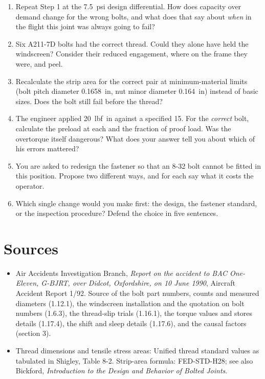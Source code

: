 \documentclass[11pt,a4paper]{article}
\begin{document}
\begin{enumerate}[leftmargin=*,itemsep=3pt]
\item Repeat Step 1 at the \SI{7.5}{psi} design differential. How does capacity over demand change
  for the wrong bolts, and what does that say about \emph{when} in the flight this joint was always
  going to fail?
\item Six A211-7D bolts had the correct thread. Could they alone have held the windscreen?
  Consider their reduced engagement, where on the frame they were, and peel.
\item Recalculate the strip area for the correct pair at minimum-material limits (bolt pitch
  diameter \SI{0.1658}{in}, nut minor diameter \SI{0.164}{in}) instead of basic sizes. Does the
  bolt still fail before the thread?
\item The engineer applied \SI{20}{lbf.in} against a specified 15. For the \emph{correct} bolt,
  calculate the preload at each and the fraction of proof load. Was the overtorque itself
  dangerous? What does your answer tell you about which of his errors mattered?
\item You are asked to redesign the fastener so that an 8-32 bolt cannot be fitted in this
  position. Propose two different ways, and for each say what it costs the operator.
\item Which single change would you make first: the design, the fastener standard, or the
  inspection procedure? Defend the choice in five sentences.
\end{enumerate}

\section*{Sources}

\begin{itemize}[leftmargin=*,itemsep=1pt,font=\footnotesize]
\item[] {\footnotesize Air Accidents Investigation Branch, \emph{Report on the accident to BAC
  One-Eleven, G-BJRT, over Didcot, Oxfordshire, on 10 June 1990}, Aircraft Accident Report 1/92.
  Source of the bolt part numbers, counts and measured diameters (1.12.1), the windscreen
  installation and the quotation on bolt numbers (1.6.3), the thread-slip trials (1.16.1), the
  torque values and stores details (1.17.4), the shift and sleep details (1.17.6), and the causal
  factors (section 3).}
\item[] {\footnotesize Thread dimensions and tensile stress areas: Unified thread standard values
  as tabulated in Shigley, Table 8-2. Strip-area formula: FED-STD-H28; see also Bickford,
  \emph{Introduction to the Design and Behavior of Bolted Joints}.}
\end{itemize}

\vspace{4pt}
\end{document}
